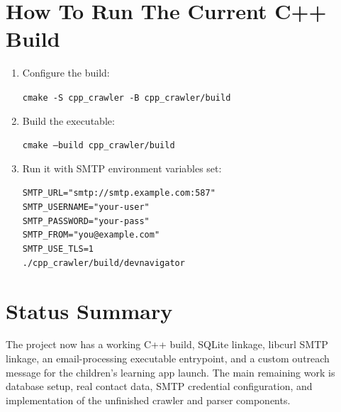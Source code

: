 \documentclass[11pt]{article}
\begin{document}
\section*{How To Run The Current C++ Build}
\begin{enumerate}
  \item Configure the build:

  \texttt{cmake -S cpp\_crawler -B cpp\_crawler/build}

  \item Build the executable:

  \texttt{cmake --build cpp\_crawler/build}

  \item Run it with SMTP environment variables set:

  \texttt{SMTP\_URL="smtp://smtp.example.com:587" \\
  SMTP\_USERNAME="your-user" \\
  SMTP\_PASSWORD="your-pass" \\
  SMTP\_FROM="you@example.com" \\
  SMTP\_USE\_TLS=1 \\
  ./cpp\_crawler/build/devnavigator}
\end{enumerate}

\section*{Status Summary}
The project now has a working C++ build, SQLite linkage, libcurl SMTP linkage, an email-processing executable entrypoint, and a custom outreach message for the children's learning app launch. The main remaining work is database setup, real contact data, SMTP credential configuration, and implementation of the unfinished crawler and parser components.
\end{document}
